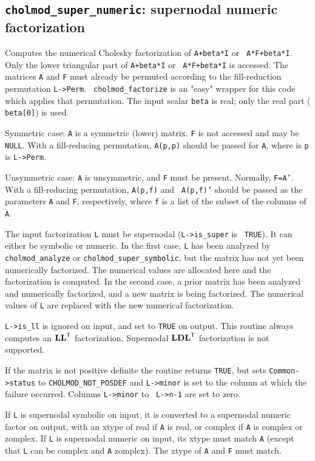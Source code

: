 \documentclass[11pt]{article}
\newcommand{\m}[1]{{\bf{#1}}}       %
\newcommand{\tr}{^{\sf T}}          %
\begin{document}
\subsection{{\tt cholmod\_super\_numeric}: supernodal numeric factorization}


Computes the numerical Cholesky factorization of {\tt A+beta*I} or {\tt
A*F+beta*I}.  Only the lower triangular part of {\tt A+beta*I} or {\tt
A*F+beta*I} is accessed.  The matrices {\tt A} and {\tt F} must already be
permuted according to the fill-reduction permutation {\tt L->Perm}.  {\tt
cholmod\_factorize} is an "easy" wrapper for this code which applies that
permutation.  The input scalar {\tt beta} is real; only the real part ({\tt
beta[0]}) is used.

Symmetric case: {\tt A} is a symmetric (lower) matrix.  {\tt F} is not accessed
and may be {\tt NULL}.  With a fill-reducing permutation, {\tt A(p,p)} should
be passed for {\tt A}, where is {\tt p} is {\tt L->Perm}.

Unsymmetric case: {\tt A} is unsymmetric, and {\tt F} must be present.
Normally, {\tt F=A'}.  With a fill-reducing permutation, {\tt A(p,f)} and {\tt
A(p,f)'} should be passed as the parameters {\tt A} and {\tt F}, respectively,
where {\tt f} is a list of the subset of the columns of {\tt A}.

The input factorization {\tt L} must be supernodal ({\tt L->is\_super} is {\tt
TRUE}).  It can either be symbolic or numeric.  In the first case, {\tt L} has
been analyzed by {\tt cholmod\_analyze} or {\tt cholmod\_super\_symbolic}, but
the matrix has not yet been numerically factorized.  The numerical values are
allocated here and the factorization is computed.  In the second case, a prior
matrix has been analyzed and numerically factorized, and a new matrix is being
factorized.  The numerical values of {\tt L} are replaced with the new
numerical factorization.

{\tt L->is\_ll} is ignored on input, and set to {\tt TRUE} on output.  This
routine always computes an $\m{LL}\tr$ factorization.  Supernodal $\m{LDL}\tr$
factorization is not supported.

If the matrix is not positive definite the routine returns {\tt TRUE}, but sets
{\tt Common->status} to {\tt CHOLMOD\_NOT\_POSDEF} and {\tt L->minor} is set to
the column at which the failure occurred.  Columns {\tt L->minor} to {\tt
L->n-1} are set to zero.

If {\tt L} is supernodal symbolic on input, it is converted to a supernodal
numeric factor on output, with an xtype of real if {\tt A} is real, or complex
if {\tt A} is complex or zomplex.  If {\tt L} is supernodal numeric on input,
its xtype must match {\tt A} (except that {\tt L} can be complex and {\tt A}
zomplex).  The xtype of {\tt A} and {\tt F} must match.
\end{document}
